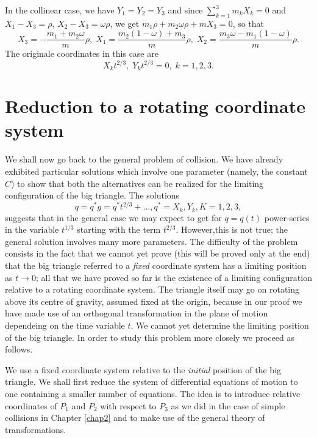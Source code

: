 In the collinear case, we have $Y_1 = Y_2 = Y_3$ and since
$\sum\limits^3_{k=1} m_k X_k =0$ and $X_1 - X_3 = \rho$, $X_2 - X_3 =
\omega \rho$, we get $m_1 \rho + m_2 \omega \rho + m X_3 = 0$, so that  
\begin{equation*}
X_3 = -\frac{m_1 + m_2 \omega}{m} \rho, \; X_1 = \frac{m_2 (1-\omega)
  + m_3}{m} \rho, \; X_2 = \frac{m_3 \omega - m_1 (1-\omega)}{m} \rho
. \tag{3.3.11}\label{chap3:eq3.3.11} 
\end{equation*}
The originale coordinates in this case are 
$$
X_k t^{2/3}, \; Y_k t^{2/3} = 0, \; k = 1,2,3.
$$

\section{Reduction to a rotating coordinate system}\label{chap3:sec4}

We shall now go back to the general problem of collision. We have
already exhibited particular solutions which involve one parameter
(name\-ly, the constant $C$) to show that both the alternatives can be
realized for the limiting configuration of the big triangle. The
solutions 
$$
q = q^* g = q^* t^{2/3} + \ldots, q^* = X_k, Y_k, K = 1,2,3,
$$
suggests  that in the general case we may expect to get for $q = q(t)$
power-series in the variable $t^{1/3}$ starting with the term
$t^{2/3}$. However,\pageoriginale this is not true; the general
solution involves many more parameters. The difficulty of the problem
consists in the fact that we cannot yet prove (this will be proved
only at the end) that the big triangle referred to a {\em fixed}
coordinate system has a limiting position as $t \to 0$; all that we
have proved so far is the existence of a limiting configuration
relative to a rotating coordinate system. The triangle itself may go
on rotating above its centre of gravity, assumed fixed at the origin,
because in our proof we have made use of an orthogonal transformation
in the plane of motion dependeing on the time variable $t$. We cannot
yet determine the limiting position of the big triangle. In order to
study this problem more closely we proceed as follows. 

We use a fixed coordinate system relative to the {\em initial}
position of the big triangle.  We shall first reduce the system of
differential equations of motion to one containing a smaller number of
equations. The idea is to introduce relative coordinates of $P_1$ and
$P_2$ with respect to $P_3$ as we did in the case of simple collisions
in Chapter \ref{chap2} and to make use of the general theory of
transformations. 

